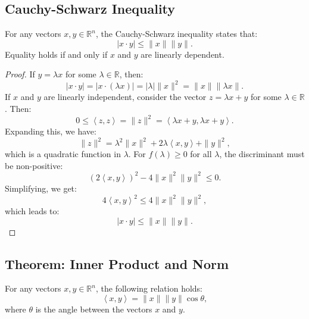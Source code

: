 \documentclass[11pt]{article}
\newcommand{\inner}[2]{\left\langle #1, #2 \right\rangle}
\begin{document}
\subsection{Cauchy-Schwarz Inequality}
For any vectors $x, y \in \mathbb{R}^n$, the Cauchy-Schwarz inequality states that:
\[ |x \cdot y| \leq \|x\| \|y\|. \]
Equality holds if and only if $x$ and $y$ are linearly dependent.
\pagebreak
\begin{proof}
    If $y = \lambda x$ for some $\lambda \in \mathbb{R}$, then:
    \[ |x \cdot y| = |x \cdot (\lambda x)| = |\lambda| \|x\|^2 = \|x\| \|\lambda x\|. \]
    If $x$ and $y$ are linearly independent, consider the vector $z = \lambda x + y$ for some $\lambda \in \mathbb{R}$. Then:
    \[ 0 \leq \inner{z}{z} = \|z\|^2 = \inner{\lambda x + y}{\lambda x + y}. \]
    Expanding this, we have:
    \[ \|z\|^2 = \lambda^2 \|x\|^2 + 2\lambda \inner{x}{y} + \|y\|^2, \]
    which is a quadratic function in $\lambda$.
    For $f(\lambda) \geq 0$ for all $\lambda$, the discriminant must be non-positive:
    \[ (2\inner{x}{y})^2 - 4\|x\|^2 \|y\|^2 \leq 0. \]
    Simplifying, we get:
    \[ 4\inner{x}{y}^2 \leq 4\|x\|^2 \|y\|^2, \]
    which leads to:
    \[ |x \cdot y| \leq \|x\| \|y\|. \]
\end{proof}

\subsection{Theorem: Inner Product and Norm}
For any vectors $x, y \in \mathbb{R}^n$, the following relation holds:
\[ \inner{x}{y} = \|x\| \|y\| \cos \theta, \]
where $\theta$ is the angle between the vectors $x$ and $y$.
\end{document}
